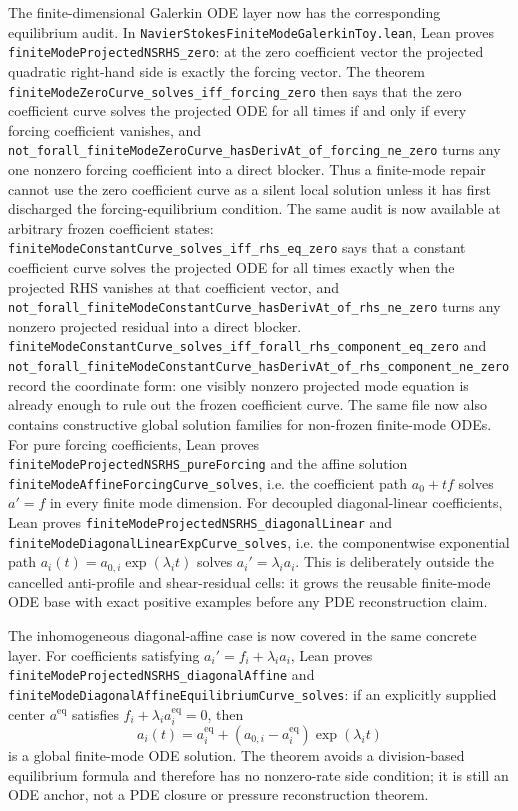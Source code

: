 \documentclass[11pt]{article}
\theoremstyle{remark}
\begin{document}
The finite-dimensional Galerkin ODE layer now has the corresponding equilibrium
audit.  In \texttt{NavierStokesFiniteModeGalerkinToy.lean}, Lean proves
\texttt{finiteModeProjectedNSRHS\_zero}: at the zero coefficient vector the
projected quadratic right-hand side is exactly the forcing vector.  The theorem
\texttt{finiteModeZeroCurve\_solves\_iff\_forcing\_zero} then says that the
zero coefficient curve solves the projected ODE for all times if and only if
every forcing coefficient vanishes, and
\texttt{not\_forall\_finiteModeZeroCurve\_hasDerivAt\_of\_forcing\_ne\_zero}
turns any one nonzero forcing coefficient into a direct blocker.  Thus a
finite-mode repair cannot use the zero coefficient curve as a silent local
solution unless it has first discharged the forcing-equilibrium condition.
The same audit is now available at arbitrary frozen coefficient states:
\texttt{finiteModeConstantCurve\_solves\_iff\_rhs\_eq\_zero} says that a
constant coefficient curve solves the projected ODE for all times exactly when
the projected RHS vanishes at that coefficient vector, and
\texttt{not\_forall\_finiteModeConstantCurve\_hasDerivAt\_of\_rhs\_ne\_zero}
turns any nonzero projected residual into a direct blocker.
\texttt{finiteModeConstantCurve\_solves\_iff\_forall\_rhs\_component\_eq\_zero}
and
\texttt{not\_forall\_finiteModeConstantCurve\_hasDerivAt\_of\_rhs\_component\_ne\_zero}
record the coordinate form: one visibly nonzero projected mode equation is
already enough to rule out the frozen coefficient curve.
The same file now also contains constructive global solution families for
non-frozen finite-mode ODEs.  For pure forcing coefficients, Lean proves
\texttt{finiteModeProjectedNSRHS\_pureForcing} and the affine solution
\texttt{finiteModeAffineForcingCurve\_solves}, i.e. the coefficient path
\(a_0+t f\) solves \(a'=f\) in every finite mode dimension.  For decoupled
diagonal-linear coefficients, Lean proves
\texttt{finiteModeProjectedNSRHS\_diagonalLinear} and
\texttt{finiteModeDiagonalLinearExpCurve\_solves}, i.e. the componentwise
exponential path \(a_i(t)=a_{0,i}\exp(\lambda_i t)\) solves
\(a_i'=\lambda_i a_i\).  This is deliberately outside the cancelled
anti-profile and shear-residual cells: it grows the reusable finite-mode ODE
base with exact positive examples before any PDE reconstruction claim.

The inhomogeneous diagonal-affine case is now covered in the same concrete
layer.  For coefficients satisfying \(a_i'=f_i+\lambda_i a_i\), Lean proves
\texttt{finiteModeProjectedNSRHS\_diagonalAffine} and
\texttt{finiteModeDiagonalAffineEquilibriumCurve\_solves}: if an explicitly
supplied center \(a^{\mathrm{eq}}\) satisfies
\(f_i+\lambda_i a^{\mathrm{eq}}_i=0\), then
\[
  a_i(t)=a^{\mathrm{eq}}_i+
    (a_{0,i}-a^{\mathrm{eq}}_i)\exp(\lambda_i t)
\]
is a global finite-mode ODE solution.  The theorem avoids a division-based
equilibrium formula and therefore has no nonzero-rate side condition; it is
still an ODE anchor, not a PDE closure or pressure reconstruction theorem.
\end{document}
